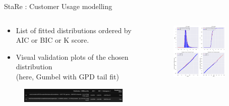 \documentclass{renault-template}
\begin{document}
\begin{frame}{StaRe : Customer Usage modelling}
  \begin{columns}[t]
    \fontsize{8}{8}\selectfont

    \begin{column}{0.5\textwidth}
      \begin{itemize}
      \item List of fitted distributions ordered by AIC or BIC or K score.
      \item Visual validation plots of the chosen distribution\\
        (here, Gumbel with GPD tail fit)
      \end{itemize}
      \begin{figure}
        \includegraphics[width=\textwidth]{Illustration_StaRe/fit_results_table.png}
      \end{figure}
    \end{column}

    \begin{column}{0.5\textwidth}
      \begin{figure}
        \includegraphics[width=0.8\textwidth]{Illustration_StaRe/fit_results.png}
      \end{figure}
    \end{column}
  \end{columns}

\end{frame}
\end{document}
